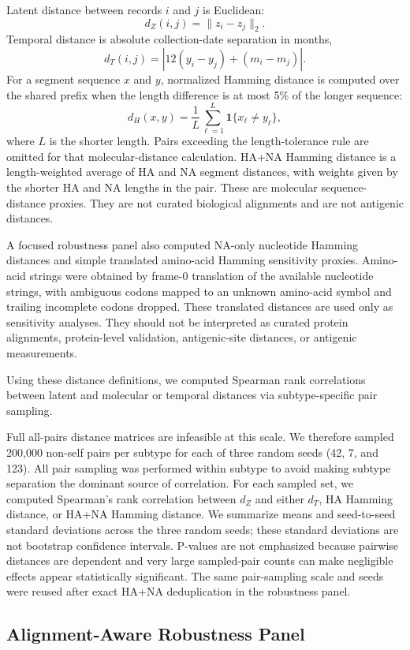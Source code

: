 \documentclass[11pt]{article}
\begin{document}
Latent distance between records $i$ and $j$ is Euclidean:
\[
d_Z(i,j)=\lVert z_i-z_j\rVert_2.
\]
Temporal distance is absolute collection-date separation in months,
\[
d_T(i,j)=\left|12(y_i-y_j)+(m_i-m_j)\right|.
\]
For a segment sequence $x$ and $y$, normalized Hamming distance is computed over the shared prefix when the length difference is at most 5\% of the longer sequence:
\[
d_H(x,y)=\frac{1}{L}\sum_{\ell=1}^{L}\mathbf{1}\{x_\ell\neq y_\ell\},
\]
where $L$ is the shorter length. Pairs exceeding the length-tolerance rule are omitted for that molecular-distance calculation. HA+NA Hamming distance is a length-weighted average of HA and NA segment distances, with weights given by the shorter HA and NA lengths in the pair. These are molecular sequence-distance proxies. They are not curated biological alignments and are not antigenic distances.

A focused robustness panel also computed NA-only nucleotide Hamming distances and simple translated amino-acid Hamming sensitivity proxies. Amino-acid strings were obtained by frame-0 translation of the available nucleotide strings, with ambiguous codons mapped to an unknown amino-acid symbol and trailing incomplete codons dropped. These translated distances are used only as sensitivity analyses. They should not be interpreted as curated protein alignments, protein-level validation, antigenic-site distances, or antigenic measurements.

Using these distance definitions, we computed Spearman rank correlations between latent and molecular or temporal distances via subtype-specific pair sampling.

Full all-pairs distance matrices are infeasible at this scale. We therefore sampled 200,000 non-self pairs per subtype for each of three random seeds (42, 7, and 123). All pair sampling was performed within subtype to avoid making subtype separation the dominant source of correlation. For each sampled set, we computed Spearman's rank correlation \cite{spearman1904} between $d_Z$ and either $d_T$, HA Hamming distance, or HA+NA Hamming distance. We summarize means and seed-to-seed standard deviations across the three random seeds; these standard deviations are not bootstrap confidence intervals. P-values are not emphasized because pairwise distances are dependent and very large sampled-pair counts can make negligible effects appear statistically significant. The same pair-sampling scale and seeds were reused after exact HA+NA deduplication in the robustness panel.

\subsection{Alignment-Aware Robustness Panel}
\end{document}

